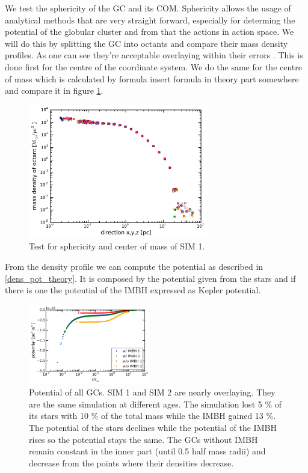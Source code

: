 \par We test the sphericity of the \ac{GC} and its \ac{COM}. Sphericity allows the usage of analytical methods that are very straight forward, especially for determing the potential of the globular cluster and from that the actions in action space. We will do this by splitting the \ac{GC} into octants and compare their mass density profiles. As one can see they're acceptable overlaying \color{red} within their errors \color{black}. This is done first for the centre of the coordinate system. We do the same for the centre of mass which is calculated by formula \color{red} insert formula in theory part somewhere \color{black} and compare it in figure \ref{fig:sphericity_com}.
\begin{figure}[htbp]
\centering
\includegraphics[width=0.7\textwidth]{Plots/sphericity_com.pdf}
\caption{Test for sphericity and center of mass of SIM 1.}
\label{fig:sphericity_com}
\end{figure}

\par From the density profile we can compute the potential as described in \ref{dens_pot_theory}. It is composed by the potential given from the stars and if there is one the potential of the \ac{IMBH} expressed as Kepler potential.
\begin{figure}[htbp]
	\centering
	\includegraphics[width=0.475\textwidth]{Plots/potential.png}
	\caption{Potential of all \acp{GC}. SIM 1 and SIM 2 are nearly overlaying. They are the same simulation at different ages. The simulation lost 5 \% of its stars with 10 \% of the total mass while the \ac{IMBH} gained 13 \%. The potential of the stars declines while the potential of the \ac{IMBH} rises so the potential stays the same. The \acp{GC} without \ac{IMBH} remain constant in the inner part (until 0.5 half mass radii) and decrease from the points where their densities decrease.}
\end{figure}


